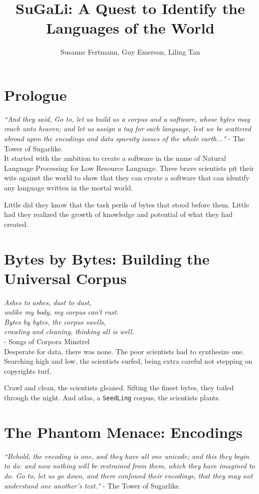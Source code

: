 \documentclass[11pt]{article}
\title{\textbf{SuGaLi: A Quest to Identify the Languages of the World}}
\author{Susanne Fertmann, Guy Emerson, Liling Tan}
\date{}
\begin{document}
\maketitle

\section{Prologue}

\emph{``And they said, Go to, let us build us a corpus and a software, whose bytes may reach unto heaven; and let us assign a tag for each language, lest we be scattered abroad upon the encodings and data sparsity issues of the whole earth..."} - The Tower of Sugarlike. \\

\noindent It started with the ambition to create a software in the name of Natural Language Processing for Low Resource Language. Three brave scientists pit their wits against the world to show that they can create a software that can identify any language written in the mortal world. 

Little did they know that the task perils of bytes that stood before them. Little had they realized the growth of knowledge and potential of what they had created. 
\\

\noindent 

\newpage
\section{Bytes by Bytes: Building the Universal Corpus}

\emph{Ashes to ashes, dust to dust, \\
unlike my body, my corpus can't rust. \\
Bytes by bytes, the corpus swells, \\
crawling and cleaning, thinking all is well. \\}
- Songs of Corpora Minstrel \\

\noindent Desperate for data, there was none. The poor scientists had to synthesize one. Searching high and low, the scientists surfed, being extra careful not stepping on copyrights turf.

Crawl and clean, the scientists gleaned. Sifting the finest bytes, they toiled through the night. And atlas, a \texttt{SeedLing} corpus, the scientists plants.

\section{The Phantom Menace: Encodings}
\emph{``Behold, the encoding is one, and they have all one unicode; and this they begin to do: and now nothing will be restrained from them, which they have imagined to do. Go to, let us go down, and there confound their encodings, that they may not understand one another's text."} - The Tower of Sugarlike. \\
\end{document}

